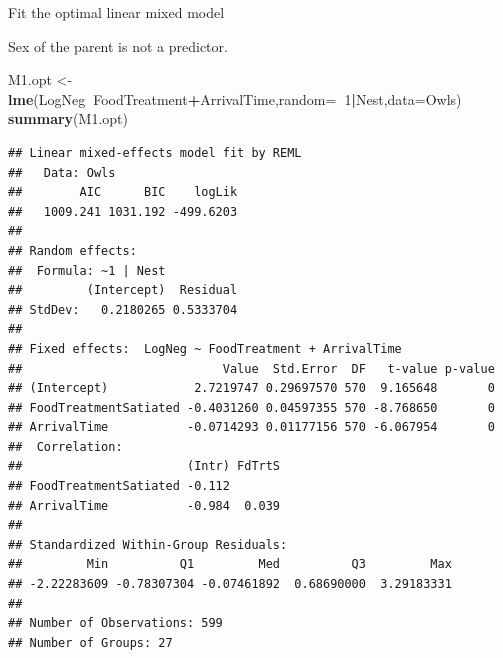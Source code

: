 \documentclass[
  ignorenonframetext,
]{beamer}
\newenvironment{Shaded}{\begin{snugshade}}{\end{snugshade}}
\newcommand{\DataTypeTok}[1]{\textcolor[rgb]{0.13,0.29,0.53}{#1}}
\newcommand{\DecValTok}[1]{\textcolor[rgb]{0.00,0.00,0.81}{#1}}
\newcommand{\KeywordTok}[1]{\textcolor[rgb]{0.13,0.29,0.53}{\textbf{#1}}}
\newcommand{\NormalTok}[1]{#1}
\newcommand{\OperatorTok}[1]{\textcolor[rgb]{0.81,0.36,0.00}{\textbf{#1}}}
\newcommand{\StringTok}[1]{\textcolor[rgb]{0.31,0.60,0.02}{#1}}
\begin{document}
\begin{frame}[fragile]{Fit the optimal linear mixed model}
\protect\hypertarget{fit-the-optimal-linear-mixed-model}{}

Sex of the parent is not a predictor. \tiny

\begin{Shaded}
\begin{Highlighting}[]
\NormalTok{M1.opt <-}\StringTok{ }\KeywordTok{lme}\NormalTok{(LogNeg}\OperatorTok{~}\NormalTok{FoodTreatment}\OperatorTok{+}\NormalTok{ArrivalTime,}\DataTypeTok{random=}\OperatorTok{~}\DecValTok{1}\OperatorTok{|}\NormalTok{Nest,}\DataTypeTok{data=}\NormalTok{Owls)}
\KeywordTok{summary}\NormalTok{(M1.opt)}
\end{Highlighting}
\end{Shaded}

\begin{verbatim}
## Linear mixed-effects model fit by REML
##   Data: Owls 
##        AIC      BIC    logLik
##   1009.241 1031.192 -499.6203
## 
## Random effects:
##  Formula: ~1 | Nest
##         (Intercept)  Residual
## StdDev:   0.2180265 0.5333704
## 
## Fixed effects:  LogNeg ~ FoodTreatment + ArrivalTime 
##                            Value  Std.Error  DF   t-value p-value
## (Intercept)            2.7219747 0.29697570 570  9.165648       0
## FoodTreatmentSatiated -0.4031260 0.04597355 570 -8.768650       0
## ArrivalTime           -0.0714293 0.01177156 570 -6.067954       0
##  Correlation: 
##                       (Intr) FdTrtS
## FoodTreatmentSatiated -0.112       
## ArrivalTime           -0.984  0.039
## 
## Standardized Within-Group Residuals:
##         Min          Q1         Med          Q3         Max 
## -2.22283609 -0.78307304 -0.07461892  0.68690000  3.29183331 
## 
## Number of Observations: 599
## Number of Groups: 27
\end{verbatim}

\end{frame}
\end{document}
